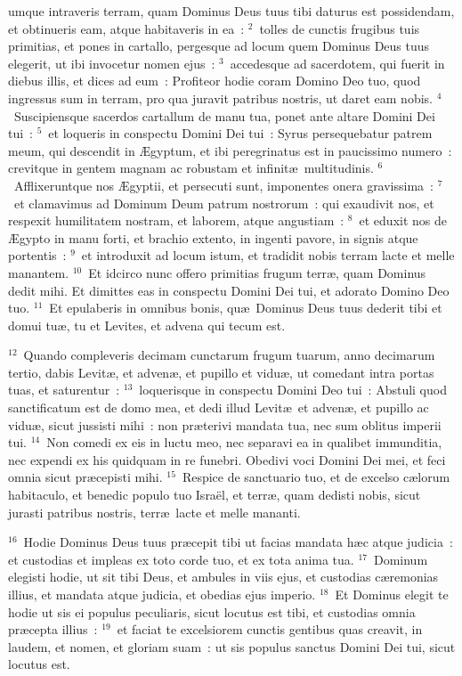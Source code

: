\bchapter
{}umque intraveris terram, quam Dominus Deus tuus tibi daturus est possidendam, et obtinueris eam, atque habitaveris in ea~:
${}^{2}$~tolles de cunctis frugibus tuis primitias, et pones in cartallo, pergesque ad locum quem Dominus Deus tuus elegerit, ut ibi invocetur nomen ejus~:
${}^{3}$~accedesque ad sacerdotem, qui fuerit in diebus illis, et dices ad eum~: Profiteor hodie coram Domino Deo tuo, quod ingressus sum in terram, pro qua juravit patribus nostris, ut daret eam nobis.
${}^{4}$~Suscipiensque sacerdos cartallum de manu tua, ponet ante altare Domini Dei tui~:
${}^{5}$~et loqueris in conspectu Domini Dei tui~: Syrus persequebatur patrem meum, qui descendit in \AE gyptum, et ibi peregrinatus est in paucissimo numero~: crevitque in gentem magnam ac robustam et infinit\ae\ multitudinis.
${}^{6}$~Afflixeruntque nos \AE gyptii, et persecuti sunt, imponentes onera gravissima~:
${}^{7}$~et clamavimus ad Dominum Deum patrum nostrorum~: qui exaudivit nos, et respexit humilitatem nostram, et laborem, atque angustiam~:
${}^{8}$~et eduxit nos de \AE gypto in manu forti, et brachio extento, in ingenti pavore, in signis atque portentis~:
${}^{9}$~et introduxit ad locum istum, et tradidit nobis terram lacte et melle manantem.
${}^{10}$~Et idcirco nunc offero primitias frugum terr\ae , quam Dominus dedit mihi. Et dimittes eas in conspectu Domini Dei tui, et adorato Domino Deo tuo.
${}^{11}$~Et epulaberis in omnibus bonis, qu\ae\ Dominus Deus tuus dederit tibi et domui tu\ae , tu et Levites, et advena qui tecum est.


${}^{12}$~Quando compleveris decimam cunctarum frugum tuarum, anno decimarum tertio, dabis Levit\ae , et adven\ae , et pupillo et vidu\ae , ut comedant intra portas tuas, et saturentur~:
${}^{13}$~loquerisque in conspectu Domini Deo tui~: Abstuli quod sanctificatum est de domo mea, et dedi illud Levit\ae\ et adven\ae , et pupillo ac vidu\ae , sicut jussisti mihi~: non pr\ae terivi mandata tua, nec sum oblitus imperii tui.
${}^{14}$~Non comedi ex eis in luctu meo, nec separavi ea in qualibet immunditia, nec expendi ex his quidquam in re funebri. Obedivi voci Domini Dei mei, et feci omnia sicut pr\ae cepisti mihi.
${}^{15}$~Respice de sanctuario tuo, et de excelso c\ae lorum habitaculo, et benedic populo tuo Isra\"el, et terr\ae , quam dedisti nobis, sicut jurasti patribus nostris, terr\ae\ lacte et melle mananti.


${}^{16}$~Hodie Dominus Deus tuus pr\ae cepit tibi ut facias mandata h\ae c atque judicia~: et custodias et impleas ex toto corde tuo, et ex tota anima tua.
${}^{17}$~Dominum elegisti hodie, ut sit tibi Deus, et ambules in viis ejus, et custodias c\ae remonias illius, et mandata atque judicia, et obedias ejus imperio.
${}^{18}$~Et Dominus elegit te hodie ut sis ei populus peculiaris, sicut locutus est tibi, et custodias omnia pr\ae cepta illius~:
${}^{19}$~et faciat te excelsiorem cunctis gentibus quas creavit, in laudem, et nomen, et gloriam suam~: ut sis populus sanctus Domini Dei tui, sicut locutus est.

